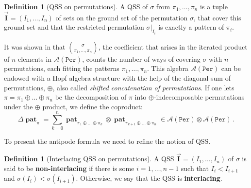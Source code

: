 \documentclass[submission]{FPSAC2023}
\theoremstyle{definition}
\newtheorem{defin}[thm]{Definition}
\newcommand{\III}{\vec{\mathbf{I}}}
\DeclareMathOperator{\pat}{\mathbf{pat}}
\begin{document}
\begin{defin}[QSS on permutations]\label{defin:QSS}
A QSS of $\sigma$ from $\pi_1, \dots, \pi_n$ is a tuple $\III = (I_1, \dots, I_n)$ of sets on the ground set of the permutation $\sigma$, that cover this ground set and that the restricted permutation $\sigma|_{I_i}$ is exactly a pattern of $\pi_i$.
\end{defin}
It was shown in \cite{Penaguiao2020} that $\binom{\sigma}{\pi_1, \dots, \pi_n}$, the coefficient that arises in the iterated product of $n$ elements in $\mathcal A(\mathtt{Per})$, counts the number of ways of covering $\sigma$ with $n$ permutations, each fitting the patterns $\pi_1, \dots, \pi_n$.
This algebra $\mathcal A(\mathtt{Per})$ can be endowed with a Hopf algebra structure with the help of the diagonal sum of permutations, $\oplus$, also called \emph{shifted concatenation of permutations}.
If one lets $\pi = \pi_1 \oplus \dots \oplus \pi_n$ be the decomposition of $\pi$ into $\oplus$-indecomposable permutations under the $\oplus$ product, we define the coproduct:
$$\Delta \pat_{\pi} = \sum_{k=0}^n \pat_{\pi_1\oplus \dots \oplus \pi_k} \otimes \pat_{\pi_{k+1}\oplus \dots \oplus \pi_n} \in \mathcal A (\mathtt{Per}) \otimes \mathcal A (\mathtt{Per})\, .$$

To present the antipode formula we need to refine the notion of QSS.
\begin{defin}[Interlacing QSS on permutations]
A QSS $\III = (I_1, \dots, I_n)$ of $\sigma$ is said to be \textbf{non-interlacing} if there is some $i=1, \dots, n-1$ such that $I_i < I_{i+1}$ and $\sigma(I_i) < \sigma(I_{i+1})$.
Otherwise, we say that the QSS is \textbf{interlacing}. 
\end{defin}
\end{document}
